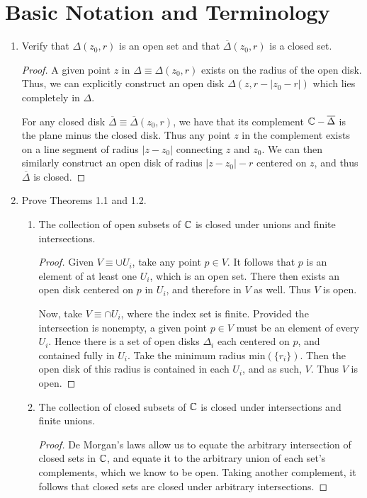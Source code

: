 \documentclass[11pt, a4paper, latinreim, shortsets]{notes}
\begin{document}
\section{Basic Notation and Terminology}
\begin{enumerate}[label={\bfseries II.5.\arabic*}]
	\item  Verify that $\Delta(z_0, r)$ is an open set and that $\overline{\Delta}(z_0,r)$ is a
	closed set.
	
	\begin{proof}
		A given point $z$ in $\Delta \equiv \Delta(z_0, r)$ exists on the radius of the open disk. Thus,
		we can explicitly construct an open disk $\Delta(z, r-|z_0-r|)$ which lies completely in $\Delta$.

		For any closed disk $\overline{\Delta} \equiv \overline{\Delta}(z_0, r)$, we have that its complement
		$\mathbb{C} - \overline{\Delta}$ is the plane minus the closed disk. Thus any point $z$ in the complement
		exists on a line segment of radius $|z-z_0|$ connecting $z$ and $z_0$. We can then similarly
		construct an open disk of radius $|z-z_0|-r$ centered on $z$,	and thus $\overline\Delta$ is closed.
	\end{proof}

	\item Prove Theorems 1.1 and 1.2.
		\begin{enumerate}[label={\bfseries Theorem 1.\arabic*}]
			\item The collection of open subsets of $\mathbb{C}$ is closed under unions and finite intersections.
			\begin{proof}
				Given $V \equiv \cup U_i$, take any point $p \in V$. It follows that $p$ is an element of at
				least one $U_i$, which is an open set. There then exists an open disk centered on $p$ in $U_i$,
				and therefore in $V$ as well. Thus $V$ is open.

				Now, take $V \equiv \cap U_i$, where the index set is finite. Provided the intersection is
				nonempty, a given point $p \in V$ must be an element of every $U_i$. Hence there is a set of
				open disks $\Delta_i$ each centered on $p$, and contained fully in $U_i$. Take the minimum
				radius min$(\{r_i\})$. Then the open disk of this radius is contained in each $U_i$, and as
				such, $V$. Thus $V$ is open.
			\end{proof}

			\item The collection of closed subsets of $\mathbb{C}$ is closed under intersections and finite unions.
			\begin{proof}
				De Morgan's laws allow us to equate the arbitrary intersection of closed sets in $\mathbb{C}$, and
				equate it to the arbitrary union of each set's complements, which we know to be open. Taking
				another complement, it follows that closed sets are closed under arbitrary intersections.


\end{proof}
\end{enumerate}
\end{enumerate}
\end{document}
